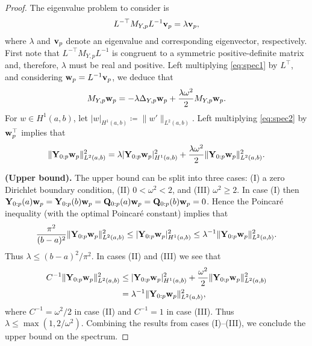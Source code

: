 \documentclass[hidelinks,onefignum,onetabnum]{siamart220329}
\begin{document}
\begin{proof}
The eigenvalue problem to consider is
\begin{align}
L^{-\top} M_{Y,p} L^{-1} {\bf v}_p = \lambda {\bf v}_p,
\label{eq:spec1}
\end{align}
where $\lambda$ and ${\bf v}_p$ denote an eigenvalue and corresponding eigenvector, respectively. First note that $L^{-\top} M_{Y,p} L^{-1}$ is congruent to a symmetric positive-definite matrix and, therefore, $\lambda$ must be real and positive. Left multiplying \cref{eq:spec1} by $L^\top$, and considering ${\bf w}_p = L^{-1} {\bf v}_p$, we deduce that
\begin{align}
M_{Y,p} {\bf w}_p = - \lambda \Delta_{Y,p} {\bf w}_p + \frac{\lambda \omega^2}{2} M_{Y,p}{\bf w}_p.
\label{eq:spec2}
\end{align}
For $w \in H^1(a,b)$, let $|w|_{H^1(a,b)} \coloneqq \|w'\|_{L^2(a,b)}$.  Left multiplying \cref{eq:spec2} by ${\bf w}^\top_p$ implies that
\begin{align}
\| {\bf Y}_{0:p} {\bf w}_p\|^2_{L^2(a,b)} = \lambda | {\bf Y}_{0:p} {\bf w}_p|^2_{H^1(a,b)} + \frac{\lambda \omega^2}{2} \| {\bf Y}_{0:p} {\bf w}_p\|^2_{L^2(a,b)}.
\label{eq:spec3}
\end{align}

\noindent \textbf{(Upper bound).} The upper bound can be split into three cases: (I)  a zero Dirichlet boundary condition, (II) $0<\omega^2 < 2$, and (III) $\omega^2 \geq 2$. In case (I) then ${\bf Y}_{0:p}(a){\bf w}_p = {\bf Y}_{0:p}(b) {\bf w}_p = {\bf Q}_{0:p}(a){\bf w}_p = {\bf Q}_{0:p}(b) {\bf w}_p= 0$. Hence the Poincar\'e inequality (with the optimal Poincar\'e constant) implies that \cite{payne1960optimal}
\begin{align}
\frac{\pi^2}{(b-a)^2}\| {\bf Y}_{0:p} {\bf w}_p\|^2_{L^2(a,b)}  \leq  | {\bf Y}_{0:p} {\bf w}_p|^2_{H^1(a,b)}  \leq \lambda^{-1} \| {\bf Y}_{0:p} {\bf w}_p\|^2_{L^2(a,b)}.
\end{align}
Thus $\lambda \leq (b-a)^2/\pi^2$. In cases (II) and (III) we see that
\begin{align}
\begin{split}
C^{-1} \| {\bf Y}_{0:p} {\bf w}_p\|^2_{L^2(a,b)}
& \leq | {\bf Y}_{0:p} {\bf w}_p|^2_{H^1(a,b)} + \frac{\omega^2}{2} \| {\bf Y}_{0:p} {\bf w}_p\|^2_{L^2(a,b)}\\
&=  \lambda^{-1} \| {\bf Y}_{0:p} {\bf w}_p\|^2_{L^2(a,b)},
\end{split}
\end{align}
where $C^{-1} = \omega^2/2$ in case (II) and $C^{-1} = 1$ in case (III). Thus $\lambda \leq \max(1,2/\omega^2)$. Combining the results from cases (I)--(III), we conclude the upper bound on the spectrum. 


\end{proof}
\end{document}
